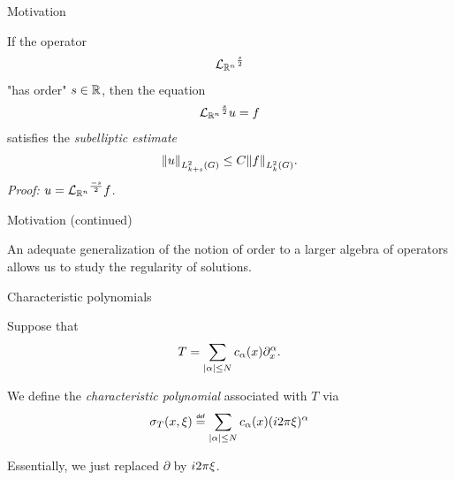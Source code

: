 \documentclass{beamer}
\begin{document}
\begin{frame}
    {Motivation}

    If the operator
    \begin{align*}
        {\Laplacian [\R^n]}^\frac s 2
    \end{align*}
    "has order" $s \in \R$,
    \pause
    then the equation
    \begin{align*}
        {\Laplacian [\R^n]}^\frac s 2 u = f
    \end{align*}
    satisfies the \emph{subelliptic estimate}
    \begin{align*}
        \norm [\Sobolev {k + s}] u
        \leq C \norm [\Sobolev k] f.
    \end{align*}
    \pause
    \emph{Proof:} $u = {\Laplacian [\R^n]}^\frac {-s} 2 f$.
\end{frame}

\begin{frame}
    {Motivation (continued)}

    An adequate generalization of the notion of order to a larger algebra of operators allows us to study the regularity of solutions.
\end{frame}

\begin{frame}
    {Characteristic polynomials}

    \begin{definition}
        Suppose that
        \begin{align*}
            T =
            \sum_{\abs \alpha \leq N}
            c_\alpha(x)
            \iD{x^\alpha}.
        \end{align*}

        We define the \emph{characteristic polynomial}
        associated with $T$ via
        \begin{align*}
            \sigma_T(x, \xi) \defeq
            \sum_{\abs \alpha \leq N}
            c_\alpha(x)
            (\i \turn \xi)^\alpha
        \end{align*}
    \end{definition}

    \pause
    Essentially, we just replaced $\partial$ by $\i \turn \xi$.
\end{frame}
\end{document}
